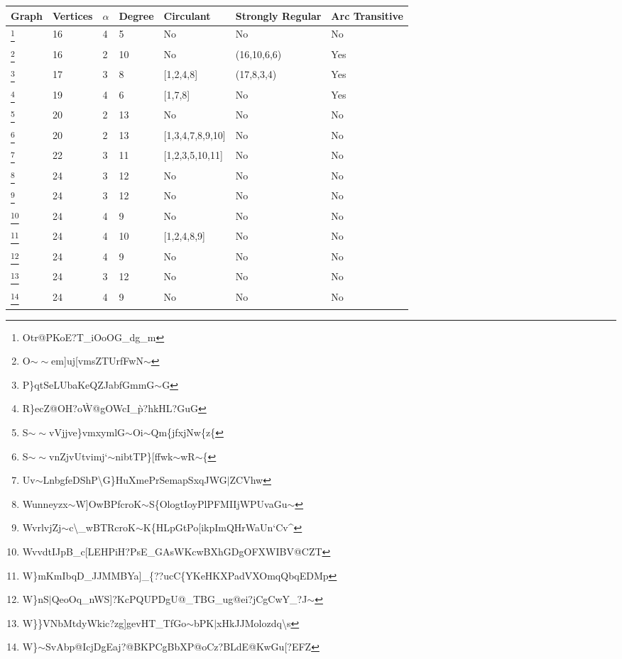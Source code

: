 \documentclass[12pt]{article}
\theoremstyle{parenbold}
\begin{document}
\renewcommand{\thempfootnote}{\arabic{mpfootnote}}
\begin{center}
\begin{minipage}{\textwidth}
\small
\begin{tabular}{ |p{1cm}|p{1.5cm}|p{0.5cm}|p{1.5cm}|p{2.7cm}|p{2cm}|p{1cm}|} 
 \hline
 Graph & Vertices & $\alpha$ & Degree & Circulant & Strongly Regular & Arc Transitive\\ 
 \hline
 \footnote{Otr@PKoE?T\_iOoOG\_dg\_m\label{graph1}} & 16 & 4 & 5 & No & No & No\\
 \hline
 \footnote{O$\sim\sim$em]uj[vmsZTUrfFwN$\sim$\label{graph2}} & 16 & 2 & 10 & No & (16,10,6,6) & Yes \\
 \hline
 \footnote{P\}qtSeLUbaKeQZJabfGmmG$\sim$G\label{graph3}} & 17 &  3 & 8 & [1,2,4,8] & (17,8,3,4) & Yes\\
 \hline
 \footnote{R\}ecZ@OH?o\`W@gOWcI\_\`p?hkHL?GuG\label{graph4}} & 19 & 4 & 6 & [1,7,8] & No & Yes \\
 \hline
 \footnote{S$\sim\sim$vVjjve\}vmxymlG$\sim$Oi$\sim$Qm\{jfxjNw\{z\{\label{graph5}} & 20 & 2 & 13 & No & No & No\\
 \hline
 \footnote{S$\sim\sim$vnZjvUtvimj`$\sim$nibtTP\}[ffwk$\sim$wR$\sim$\{\label{graph6}} & 20 & 2 & 13 & [1,3,4,7,8,9,10] & No & No\\
 \hline
 \footnote{Uv$\sim$LnbgfeDShP\textbackslash{}G\}HuXmePrSemapSxqJWG$\vert$ZCVhw\label{graph7}} & 22 & 3 & 11 & [1,2,3,5,10,11] & No & No\\
 \hline
 \footnote{Wunneyzx$\sim$W]OwBPfcroK$\sim$S\{OlogtIoyPlPFMIIjWPUvaGu$\sim$\label{graph8}} & 24 & 3 & 12 & No & No & No\\
 \hline
 \footnote{WvrlvjZj$\sim$c\textbackslash{}\_wBTRcroK$\sim$K\{HLpGtPo[ikpImQHrWaUn`Cv\^{}\label{graph9}} & 24 & 3 & 12 & No & No & No\\
 \hline
 \footnote{WvvdtIJpB\_c[LEHPiH?PsE\_GAsWKcwBXhGDgOFXWIBV@CZT\label{graph10}} & 24 & 4 & 9 & No & No & No\\
 \hline
 \footnote{W\}mKmIbqD\_JJMMBYa]\_\{??ucC\{YKeHKXPadVXOmqQbqEDMp\label{graph11}} & 24 & 4 & 10 & [1,2,4,8,9] & No & No\\
 \hline
 \footnote{W\}nS$\vert$QeoOq\_nWS]?KcPQUPDgU@\_TBG\_ug@ei?jCgCwY\_?J$\sim$\label{graph12}} & 24 & 4 & 9 & No & No & No\\
 \hline
 \footnote{W\}\}VNbMtdyWkic?zg]gevHT\_TfGo$\sim$bPK$\vert$xHkJJMolozdq\textbackslash{}s\label{graph13}} & 24 & 3 & 12 & No & No & No\\
 \hline
 \footnote{W\}$\sim$SvAbp@IcjDgEaj?@BKPCgBbXP@oCz?BLdE@KwGu[?EFZ\label{graph14}} & 24 & 4 & 9 & No & No & No\\

\end{tabular}
\end{minipage}
\end{center}
\end{document}
